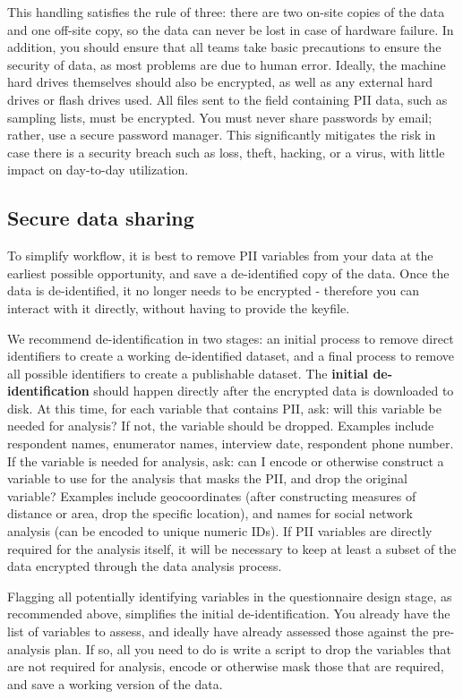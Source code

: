 This handling satisfies the rule of three: there are two on-site copies of the data and one off-site copy, so the data can never be lost in case of hardware failure.
In addition, you should ensure that all teams take basic precautions to ensure the security of data, as most problems are due to human error.
Ideally, the machine hard drives themselves should also be encrypted, as well as any external hard drives or flash drives used.
All files sent to the field containing PII data, such as sampling lists, must be encrypted.
You must never share passwords by email; rather, use a secure password manager.
This significantly mitigates the risk in case there is a security breach such as loss, theft, hacking, or a virus, with little impact on day-to-day utilization.

\subsection{Secure data sharing}
To simplify workflow, it is best to remove PII variables from your data at the earliest possible opportunity, and save a de-identified copy of the data.
Once the data is de-identified, it no longer needs to be encrypted - therefore you can interact with it directly, without having to provide the keyfile.

We recommend de-identification in two stages: an initial process to remove direct identifiers to create a working de-identified dataset, and a final process to remove all possible identifiers to create a publishable dataset.
The \textbf{initial de-identification} should happen directly after the encrypted data is downloaded to disk. At this time, for each variable that contains PII, ask: will this variable be needed for analysis?
If not, the variable should be dropped. Examples include respondent names, enumerator names, interview date, respondent phone number.
If the variable is needed for analysis, ask: can I encode or otherwise construct a variable to use for the analysis that masks the PII, and drop the original variable?
Examples include geocoordinates (after constructing measures of distance or area, drop the specific location), and names for social network analysis (can be encoded to unique numeric IDs).
If PII variables are directly required for the analysis itself, it will be necessary to keep at least a subset of the data encrypted through the data analysis process.

Flagging all potentially identifying variables in the questionnaire design stage, as recommended above, simplifies the initial de-identification.
You already have the list of variables to assess, and ideally have already assessed those against the pre-analysis plan.
If so, all you need to do is write a script to drop the variables that are not required for analysis, encode or otherwise mask those that are required, and save a working version of the data.

